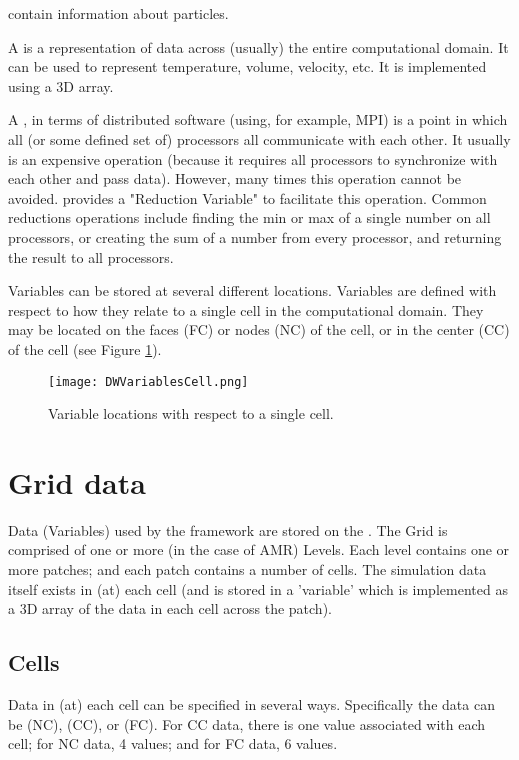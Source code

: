  contain information about particles. 

A  is a representation of data across (usually) the entire 
computational domain. It can be used to represent 
temperature, volume, velocity, etc. It is implemented using a 3D array. 

A , in terms of distributed software (using, for example, MPI) is 
a point in which all (or some defined set of) processors all communicate with 
each other. It usually is an expensive operation (because it requires all 
processors to synchronize with each other and pass data). However, many times 
this operation cannot be avoided. \Vaango provides a "Reduction Variable" to 
facilitate this operation. Common reductions operations include finding the 
min or max of a single number on all processors, or creating the sum of a 
number from every processor, and returning the result to all processors. 

Variables can be stored at several different locations. Variables are defined 
with respect to how they relate to a single cell in the computational 
domain. They may be located on the faces (FC) or nodes (NC) of the cell, 
or in the center (CC) of the cell (see Figure \ref{Fig:DWVariablesCell}). 
\begin{figure}
  \centering
  \texttt{[image: DWVariablesCell.png]}
  \caption{Variable locations with respect to a single cell.}
  \label{Fig:DWVariablesCell}
\end{figure}



\section{Grid data}
Data (Variables) used by the framework are stored on the . The Grid is comprised 
of one or more (in the case of AMR) Levels. Each level contains one or more patches; and each 
patch contains a number of cells. The simulation data itself exists in (at) each cell (and 
is stored in a 'variable' which is implemented as a 3D array of the data in each cell across 
the patch).

\subsection{Cells}
Data in (at) each cell can be specified in several ways. Specifically the data can be 
 (NC),  (CC), or  (FC). 
For CC data, there is one value associated with each cell; for NC data, 4 values; and 
for FC data, 6 values. 

